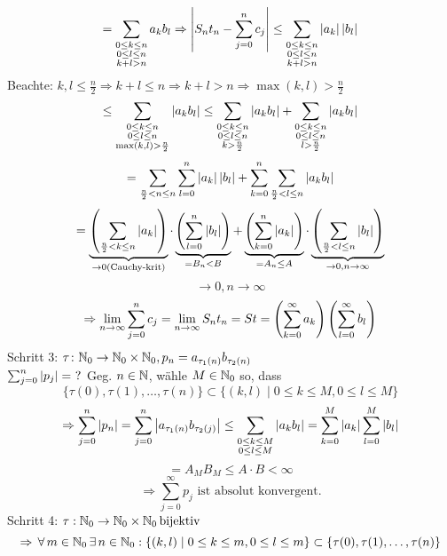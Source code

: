\documentclass[../ana1.tex]{subfiles}
\begin{document}
\begin{bew}
    \[ = \sum_{\substack{0\leq k \leq n \\ 0\leq l \leq n \\ k+l>n}} a_k b_l \Rightarrow \left| S_n t_n - \sum_{j=0}^n c_j \right| \leq \sum_{\substack{0\leq k\leq n \\ 0\leq l \leq n \\ k+l>n}} \left|a_k\right|\left|b_l\right| \]
    Beachte: \( k,l \leq \frac{n}{2} \Rightarrow k + l \leq n \Rightarrow k + l > n \Rightarrow \max(k,l) > \frac{n}{2} \)
    \[ \leq \sum_{\substack{0\leq k\leq n \\ 0\leq l \leq n \\ \max(k,l) > \frac{n}{2}}} \left|a_k b_l\right| \leq \sum_{\substack{0\leq k\leq n \\ 0\leq l \leq n \\ k > \frac{n}{2}}} \left|a_k b_l\right| + \sum_{\substack{0\leq k\leq n \\ 0\leq l \leq n \\ l>\frac{n}{2}}} \left|a_k b_l\right| \]
    \[ = \sum_{\frac{n}{2} < n \leq n} \sum_{l=0}^n \left|a_k\right|\left|b_l\right| + \sum_{k=0}^n \sum_{\frac{n}{2} < l \leq n} \left|a_k b_l\right| \]
    \[ = \underbrace{\left( \sum_{\frac{n}{2} < k \leq n} \left|a_k\right| \right)}_{\rightarrow 0 \text{(Cauchy-krit)}} \cdot \underbrace{\left( \sum_{l=0}^n \left|b_l\right| \right)}_{=B_n < B} + \underbrace{\left( \sum_{k=0}^n \left|a_k\right| \right)}_{=A_n \leq A} \cdot \underbrace{ \left( \sum_{\frac{n}{2} < l \leq n} \left|b_l\right| \right) }_{\rightarrow 0, n\rightarrow\infty} \]
    \[ \rightarrow 0, n\rightarrow\infty \]
    \[ \Rightarrow \lim\limits_{n\rightarrow\infty} \sum_{j=0}^n c_j = \lim\limits_{n\rightarrow\infty} S_n t_n = S t = \left( \sum_{k=0}^\infty a_k \right) \left( \sum_{l=0}^\infty b_l \right) \]
    Schritt 3: \( \tau \colon \mathbb{N}_0 \rightarrow \mathbb{N}_0 \times \mathbb{N}_0, p_n = a_{\tau_1(n)} b_{\tau_2(n)} \) \\
    \( \sum_{j=0}^n \left|p_j\right| = \ ? \)
    Geg. \(n\in\mathbb{N} \), wähle \( M\in\mathbb{N}_0 \) so, dass 
    \[ \{ \tau(0), \tau(1), \ldots, \tau(n) \} \subset \{ (k,l) \; \vert \; 0 \leq k \leq M, 0 \leq l \leq M \} \]
    \[ \Rightarrow \sum_{j=0}^n \left|p_n\right| = \sum_{j=0}^n \left|a_{\tau_1(n)} b_{\tau_2(j)}\right| \leq \sum_{\substack{0\leq k\leq M \\ 0 \leq l \leq M}} \left|a_k b_l\right| = \sum_{k=0}^M \left|a_k\right| \sum_{l=0}^M \left|b_l\right| \] 
    \[ = A_M B_M \leq A \cdot B < \infty \]
    \[ \Rightarrow \sum_{j=0}^\infty p_j \text{ ist absolut konvergent.} \]
    Schritt 4: \( \tau : \mathbb{N}_0 \rightarrow \mathbb{N}_0 \times \mathbb{N}_0 \operatorname{bijektiv} \)
    \[ \Rightarrow \, \forall \, m\in\mathbb{N}_0 \, \exists \, n\in\mathbb{N}_0 : \{ (k,l) \; \vert \; 0\leq k\leq m, 0\leq l\leq m \} \subset \{ \tau(0), \tau(1), \ldots, \tau(n) \} \]

\end{bew}
\end{document}
